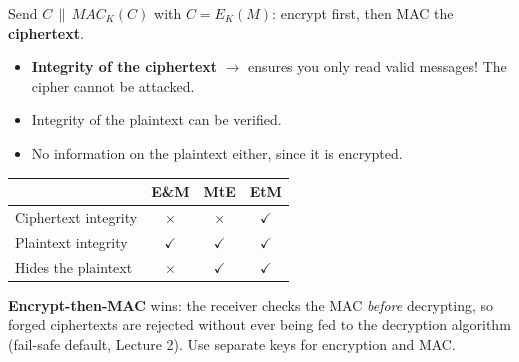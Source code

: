 \begin{defnbox}[title=Encrypt-then-MAC]
Send $C \,\|\, MAC_K(C)$ with $C = E_K(M)$: encrypt first, then MAC the
\textbf{ciphertext}.
\begin{itemize}
  \item[$\checkmark$] \textbf{Integrity of the ciphertext} $\to$ ensures you only read
        valid messages! The cipher cannot be attacked.
  \item[$\checkmark$] Integrity of the plaintext can be verified.
  \item[$\checkmark$] No information on the plaintext either, since it is encrypted.
\end{itemize}
\end{defnbox}

\begin{keybox}[title=Which composition to use?]
\begin{center}
\begin{tabular}{l|c|c|c}
                     & \textbf{E\&M} & \textbf{MtE} & \textbf{EtM} \\ \hline
Ciphertext integrity & $\times$      & $\times$     & $\checkmark$ \\
Plaintext integrity  & $\checkmark$  & $\checkmark$ & $\checkmark$ \\
Hides the plaintext  & $\times$      & $\checkmark$ & $\checkmark$
\end{tabular}
\end{center}
\textbf{Encrypt-then-MAC} wins: the receiver checks the MAC \emph{before} decrypting, so
forged ciphertexts are rejected without ever being fed to the decryption algorithm
(fail-safe default, Lecture 2). Use separate keys for encryption and MAC.
\end{keybox}

